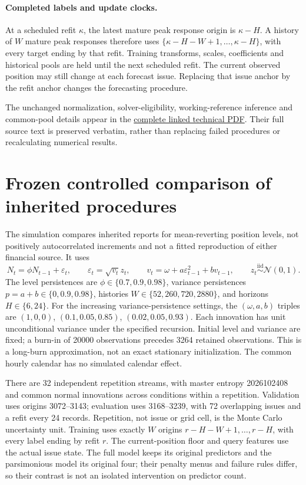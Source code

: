 \documentclass[11pt,a4paper]{article}
\begin{document}
\paragraph{Completed labels and update clocks.}
At a scheduled refit \(\kappa\), the latest mature peak response origin is
\(\kappa-H\). A history of \(W\) mature peak responses therefore uses
\(\{\kappa-H-W+1,\ldots,\kappa-H\}\), with every target ending by that refit.
Training transforms, scales, coefficients and historical pools are held until
the next scheduled refit. The current observed position may still change at
each forecast issue. Replacing that issue anchor by the refit anchor changes
the forecasting procedure.


The unchanged normalization, solver-eligibility, working-reference inference and common-pool details appear in the \href{https://github.com/ByronLi0207/financial-mathematics-paper-20261020/blob/revision-v8-goal/submission-jof/extended-v9-technical.pdf}{complete linked technical PDF}. Their full source text is preserved verbatim, rather than replacing failed procedures or recalculating numerical results.

\section{Frozen controlled comparison of inherited procedures}\label{sup:v8-mc}

The simulation compares inherited reports for mean-reverting position levels,
not positively autocorrelated increments and not a fitted reproduction of either
financial source. It uses
\[
N_t=\phi N_{t-1}+\varepsilon_t,\qquad
\varepsilon_t=\sqrt{v_t}z_t,\qquad
v_t=\omega+a\varepsilon_{t-1}^{2}+bv_{t-1},\qquad
z_t\stackrel{\mathrm{iid}}{\sim}\mathcal N(0,1).
\]
The level persistences are \(\phi\in\{0.7,0.9,0.98\}\), variance persistences
\(p=a+b\in\{0,0.9,0.98\}\), histories \(W\in\{52,260,720,2880\}\), and horizons
\(H\in\{6,24\}\). For the increasing variance-persistence settings, the
\((\omega,a,b)\) triples are \((1,0,0)\), \((0.1,0.05,0.85)\), \((0.02,0.05,0.93)\). Each innovation has unit unconditional
variance under the specified recursion. Initial level and variance are fixed;
a burn-in of 20000 observations precedes 3264 retained observations.
This is a long-burn approximation, not an exact stationary initialization.
The common hourly calendar has no simulated calendar effect.

There are 32 independent repetition streams, with master entropy 2026102408 and
common normal innovations across conditions within a repetition. Validation
uses origins 3072--3143; evaluation uses 3168--3239, with
72 overlapping issues and a refit every 24 records. Repetition, not
issue or grid cell, is the Monte Carlo uncertainty unit. Training uses exactly
\(W\) origins \(r-H-W+1,\ldots,r-H\), with every label ending by refit \(r\).
The current-position floor and query features use the actual issue state.
The full model keeps its original predictors and the parsimonious model its
original four; their penalty menus and failure rules differ, so their contrast
is not an isolated intervention on predictor count.
\end{document}
